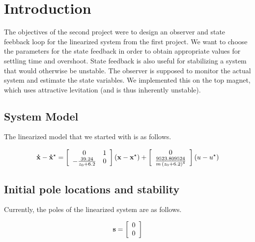 \section{Introduction}

The objectives of the second project were to design an observer and state feebback loop for the linearized system from the first project.
We want to choose the parameters for the state feedback in order to obtain appropriate values for settling time and overshoot.
State feedback is also useful for stabilizing a system that would otherwise be unstable.
The observer is supposed to monitor the actual system and estimate the state variables.
We implemented this on the top magnet, which uses attractive levitation (and is thus inherently unstable).

\subsection{System Model}

The linearized model that we started with is as follows.

\begin{equation}
	\label{eq:finalLinearizedx}
	{\bf \dot{x}} - {\bf \dot{x}^\star} = 
	\left[
		\begin{array}{cc}
			 0 & 1 \\
			 -{\frac {39.24}{z_0 + 6.2}} & 0 \\
		\end{array}
	\right]
	\left(
		{\bf x} - {\bf x^\star}
	\right)
	+ 
	\left[
		\begin{array}{c}
			 0 \\
			{\frac {9523.809524}{m\,\left( z_0 + 6.2 \right) ^{4}}} \\
		\end{array}
	\right]
	\left(
		u - u^\star
	\right)
\end{equation}


\subsection{Initial pole locations and stability}

Currently, the poles of the linearized system are as follows.

\begin{equation}
	\label{eq:poles}
	{\bf s} = 
	\left[
		\begin{array}{c}
			0 \\
			0 \\
		\end{array}
	\right]
\end{equation}